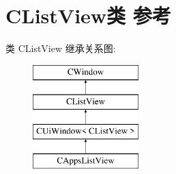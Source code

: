 \hypertarget{class_c_list_view}{}\section{C\+List\+View类 参考}
\label{class_c_list_view}
类 C\+List\+View 继承关系图\+:\begin{figure}[H]
\begin{center}
\leavevmode
\includegraphics[height=4.000000cm]{class_c_list_view}
\end{center}
\end{figure}
